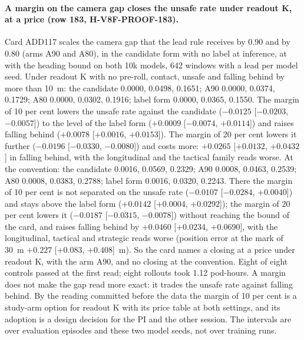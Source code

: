 \paragraph{A margin on the camera gap closes the unsafe rate under readout K, at a price (row 183, H-V8F-PROOF-183).} Card ADD117 scales the camera gap that the lead rule receives by 0.90 and by 0.80 (arms A90 and A80), in the candidate form with no label at inference, at  with the heading bound on both 10k models, 642 windows with a lead per model seed. Under readout K with no pre-roll, contact, unsafe and falling behind by more than 10~m: the candidate 0.0000, 0.0498, 0.1651; A90 0.0000, 0.0374, 0.1729; A80 0.0000, 0.0302, 0.1916; label form 0.0000, 0.0365, 0.1550. The margin of 10 per cent lowers the unsafe rate against the candidate ($-0.0125$ [$-0.0203$, $-0.0057$]) to the level of the label form ($+0.0009$ [$-0.0074$, $+0.0114$]) and raises falling behind ($+0.0078$ [$+0.0016$, $+0.0153$]). The margin of 20 per cent lowers it further ($-0.0196$ [$-0.0330$, $-0.0080$]) and costs more: $+0.0265$ [$+0.0132$, $+0.0432$] in falling behind, with the longitudinal and the tactical family reads worse. At the convention: the candidate 0.0016, 0.0569, 0.2329; A90 0.0008, 0.0463, 0.2539; A80 0.0008, 0.0383, 0.2788; label form 0.0016, 0.0320, 0.2243. There the margin of 10 per cent is not separated on the unsafe rate ($-0.0107$ [$-0.0284$, $+0.0040$]) and stays above the label form ($+0.0142$ [$+0.0004$, $+0.0292$]); the margin of 20 per cent lowers it ($-0.0187$ [$-0.0315$, $-0.0078$]) without reaching the bound of the card, and raises falling behind by $+0.0460$ [$+0.0234$, $+0.0690$], with the longitudinal, tactical and strategic reads worse (position error at the mark of 30~m $+0.227$ [$+0.083$, $+0.408$]~m). So the card names a closing at a price under readout K, with the arm A90, and no closing at the convention. Eight of eight controls passed at the first read; eight rollouts took 1.12 pod-hours. A margin does not make the gap read more exact: it trades the unsafe rate against falling behind. By the reading committed before the data the margin of 10 per cent is a study-arm option for readout K with its price table at both settings, and its adoption is a design decision for the PI and the other session. The intervals are over evaluation episodes and these two model seeds, not over training runs.

